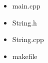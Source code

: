 \documentclass[11pt, a4paper]{article}
\begin{document}
    \begin{itemize}
        \item main.cpp
            
        \item String.h
            
        \item String.cpp
            
        \item makefile
            
    \end{itemize}
\end{document}
